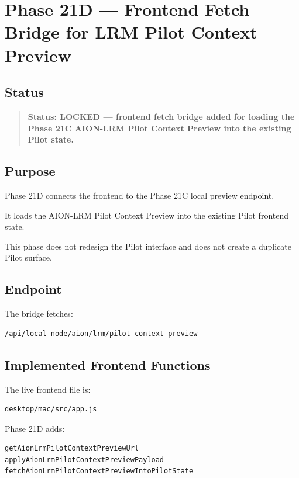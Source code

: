 \section{Phase 21D --- Frontend Fetch Bridge for LRM Pilot Context Preview}
\label{sec:phase21d-lrm-pilot-frontend-fetch-bridge-lock}

\subsection{Status}

\begin{quote}
\textbf{Status: LOCKED --- frontend fetch bridge added for loading the Phase 21C AION-LRM Pilot Context Preview into the existing Pilot state.}
\end{quote}

\subsection{Purpose}

Phase 21D connects the frontend to the Phase 21C local preview endpoint.

It loads the AION-LRM Pilot Context Preview into the existing Pilot frontend state.

This phase does not redesign the Pilot interface and does not create a duplicate Pilot surface.

\subsection{Endpoint}

The bridge fetches:

\begin{verbatim}
/api/local-node/aion/lrm/pilot-context-preview
\end{verbatim}

\subsection{Implemented Frontend Functions}

The live frontend file is:

\begin{verbatim}
desktop/mac/src/app.js
\end{verbatim}

Phase 21D adds:

\begin{verbatim}
getAionLrmPilotContextPreviewUrl
applyAionLrmPilotContextPreviewPayload
fetchAionLrmPilotContextPreviewIntoPilotState
\end{verbatim}


